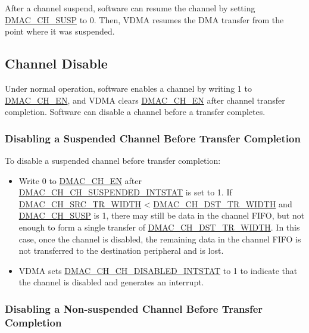 \documentclass[main\_\_EN.tex]{subfiles}
\begin{document}
After a channel suspend, software can resume the channel by setting \hyperref[fielddesc:DMACCH1SUSP]{DMAC\_CH\_SUSP} to 0. Then, VDMA resumes the DMA transfer from the point where it was suspended.

\subsection{Channel Disable}

Under normal operation, software enables a channel by writing 1 to \hyperref[fielddesc:DMACCH1EN]{DMAC\_CH\_EN}, and VDMA clears \hyperref[fielddesc:DMACCH1EN]{DMAC\_CH\_EN} after channel transfer completion.
Software can disable a channel before a transfer completes.

\subsubsection{Disabling a Suspended Channel Before Transfer Completion}

To disable a suspended channel before transfer completion:

\begin{itemize}
    \item Write 0 to \hyperref[fielddesc:DMACCH1EN]{DMAC\_CH\_EN} after \hyperref[fielddesc:DMACCHNCHSUSPENDEDINTSTAT]{DMAC\_CH\_CH\_SUSPENDED\_INTSTAT} is set to 1. If \hyperref[fielddesc:DMACCHNSRCTRWIDTH]{DMAC\_CH\_SRC\_TR\_WIDTH} < \hyperref[fielddesc:DMACCHNDSTTRWIDTH]{DMAC\_CH\_DST\_TR\_WIDTH} and \hyperref[fielddesc:DMACCH1SUSP]{DMAC\_CH\_SUSP} is 1, there may still be data in the channel FIFO, but not enough to form a single transfer of \hyperref[fielddesc:DMACCHNDSTTRWIDTH]{DMAC\_CH\_DST\_TR\_WIDTH}.
    In this case, once the channel is disabled, the remaining data in the channel FIFO is not transferred to the destination peripheral and is lost.
    \item VDMA sets \hyperref[fielddesc:DMACCHNCHDISABLEDINTSTAT]{DMAC\_CH\_CH\_DISABLED\_INTSTAT} to 1 to indicate that the channel is disabled and generates an interrupt.
\end{itemize}

\subsubsection{Disabling a Non-suspended Channel Before Transfer Completion}
\end{document}
